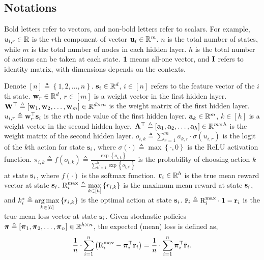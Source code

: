 \subsection{Notations}
\label{subsec:notations}

Bold letters refer to vectors, and non-bold letters refer to scalars. For example, $u_{i,r} \in {\mathbb{R}}$ is the $r$th component of vector ${\mathbf{u}}_i \in {\mathbb{R}}^m$. $n$ is the total number of states, while $m$ is the total number of nodes in each hidden layer. $h$ is the total number of actions can be taken at each state. ${\mathbf{1}}$ means all-one vector, and ${\mathbf{I}}$ refers to identity matrix, with dimensions depends on the contexts.

Denote $[n] \triangleq \left\{ 1,2, \dots, n \right\}$. ${\mathbf{s}}_i \in {\mathbb{R}}^d$, $i \in [n]$ refers to the feature vector of the $i$th state. ${\mathbf{w}}_r \in {\mathbb{R}}^d$, $r \in [m]$ is a weight vector in the first hidden layer. ${\mathbf{W}}^\top \triangleq \left[ {\mathbf{w}}_1, {\mathbf{w}}_2, \dots, {\mathbf{w}}_m \right] \in {\mathbb{R}}^{d \times m}$ is the weight matrix of the first hidden layer. $u_{i,r} \triangleq {\mathbf{w}}_r^\top {\mathbf{s}}_i$ is the $r$th node value of the first hidden layer. ${\mathbf{a}}_k \in {\mathbb{R}}^m$, $k \in [h]$ is a weight vector in the second hidden layer. ${\mathbf{A}}^\top \triangleq \left[ {\mathbf{a}}_1, {\mathbf{a}}_2, \dots, {\mathbf{a}}_h \right] \in {\mathbb{R}}^{m \times h}$ is the weight matrix of the second hidden layer. $o_{i,k} \triangleq \sum\limits_{r=1}^{m}{a_{k,r} \cdot \sigma\left( u_{i,r} \right)}$ is the logit of the $k$th action for state ${\mathbf{s}}_i$, where $\sigma(\cdot) \triangleq \max\left\{ \cdot, 0 \right\}$ is the ReLU activation function. $\pi_{i,k} \triangleq f\left( o_{i,k} \right) \triangleq \frac{\exp\left\{ o_{i,k} \right\}}{\sum\limits_{k^\prime = 1}^{h}{\exp\left\{ o_{i,k^\prime} \right\}}}$ is the probability of choosing action $k$ at state ${\mathbf{s}}_i$, where $f(\cdot)$ is the softmax function. ${\mathbf{r}}_i \in {\mathbb{R}}^h$ is the true mean reward vector at state ${\mathbf{s}}_i$. ${\text{R}}_i^{\max} \triangleq \max\limits_{k \in [h]}\left\{ r_{i,k} \right\}$ is the maximum mean reward at state ${\mathbf{s}}_i$, and $k_i^* \triangleq \operatorname*{arg\,max}\limits_{k \in [h]}{\left\{ r_{i,k} \right\}}$ is the optimal action at state ${\mathbf{s}}_i$. ${\tilde{\mathbf{r}}}_i \triangleq {\text{R}}_i^{\max} \cdot {\mathbf{1}} - {\mathbf{r}}_i$ is the true mean loss vector at state ${\mathbf{s}}_i$. Given stochastic policies ${\boldsymbol{\pi}} \triangleq \left[ {\boldsymbol{\pi}}_1, {\boldsymbol{\pi}}_2, \dots, {\boldsymbol{\pi}}_n \right] \in {\mathbb{R}}^{h \times n}$, the expected (mean) loss is defined as,
\begin{equation}
\label{eq:expected_loss}
\begin{split}
    \frac{1}{n} \cdot \sum\limits_{i=1}^{n}{ \left( {\text{R}}_i^{\max} - {\boldsymbol{\pi}}_i^\top {\mathbf{r}}_i \right) } = \frac{1}{n} \cdot \sum\limits_{i=1}^{n}{ {\boldsymbol{\pi}}_{i}^\top {\tilde{\mathbf{r}}}_{i} }.
\end{split}
\end{equation}

